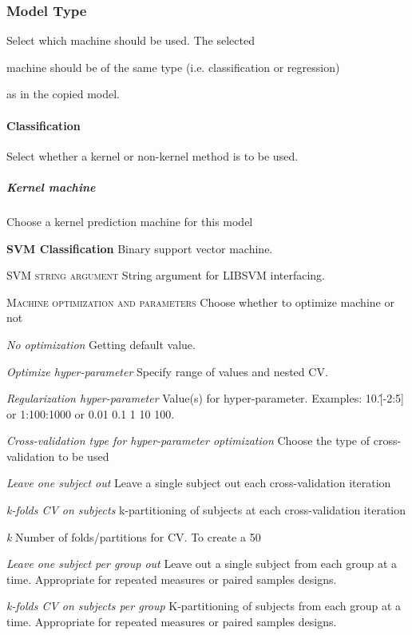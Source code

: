 \subsubsection{Model Type }
Select which machine should be used. The selected 

machine should be of the same type (i.e. classification or regression)

 as in the copied model.


\paragraph{Classification }
Select whether a kernel or non-kernel method is to be used.


\subparagraph{Kernel machine}
Choose a kernel prediction machine for this model


\textbf{SVM Classification}
Binary support vector machine.


\textsc{SVM string argument}
String argument for LIBSVM interfacing.


\textsc{Machine optimization and parameters}
Choose whether to optimize machine or not


\textsl{No optimization}
Getting default value.


\textsl{Optimize hyper-parameter}
Specify range of values and nested CV.


\textit{Regularization hyper-parameter}
Value(s) for hyper-parameter. Examples: 10.\^[-2:5] or 1:100:1000 or 0.01 0.1 1 10 100.


\textit{Cross-validation type for hyper-parameter optimization}
Choose the type of cross-validation to be used


\textit{Leave one subject out}
Leave a single subject out each cross-validation iteration


\textit{k-folds CV on subjects}
k-partitioning of subjects at each cross-validation iteration


\textit{k}
Number of folds/partitions for CV. To create a 50%


\textit{Leave one subject per group out}
Leave out a single subject from each group at a time. Appropriate for repeated measures or paired samples designs.


\textit{k-folds CV on subjects per group}
K-partitioning of subjects from each group at a time. Appropriate for repeated measures or paired samples designs.


